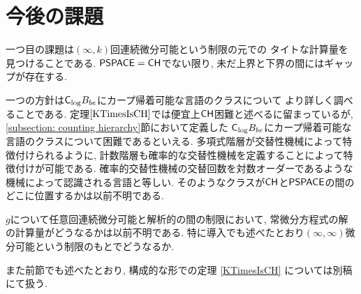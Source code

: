 \section{今後の課題}
一つ目の課題は$(\infty, k)$回連続微分可能という制限の元での
タイトな計算量を見つけることである.
$\mathsf{PSPACE} = \mathsf{CH}$でない限り, 未だ上界と下界の間にはギャップが存在する.

一つの方針は$\mathsf{C}_{\log} B_{be}$にカープ帰着可能な言語のクラスについて
より詳しく調べることである.
定理$\ref{KTimesIsCH}$では便宜上$\mathsf{CH}$困難と述べるに留まっているが,
\ref{subsection: counting hierarchy}節において定義した
$\mathsf{C}_{\log} B_{be}$にカープ帰着可能な言語のクラスについて困難であるといえる.
多項式階層が交替性機械によって特徴付けられるように,
計数階層も確率的な交替性機械を定義することによって特徴付けが可能である.
確率的交替性機械の交替回数を対数オーダーであるような機械によって認識される言語と等しい.
そのようなクラスが$\mathsf{CH}$と$\mathsf{PSPACE}$の間のどこに位置するかは以前不明である.

$g$について任意回連続微分可能と解析的の間の制限において,
常微分方程式の解の計算量がどうなるかは以前不明である.
特に導入でも述べたとおり$(\infty, \infty)$微分可能という制限のもとでどうなるか.

また前節でも述べたとおり, 構成的な形での定理 \ref{KTimesIsCH} については別稿にて扱う.
